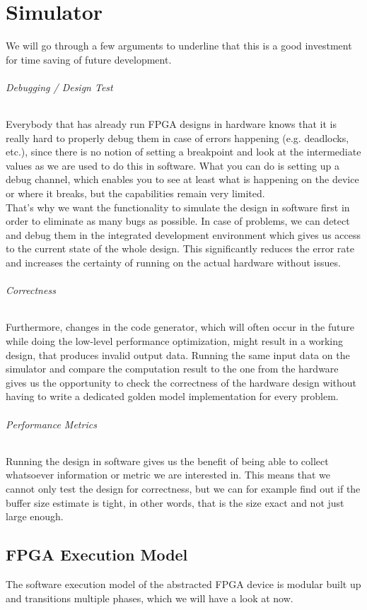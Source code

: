 \chapter{Simulator}

We will go through a few arguments to underline that this is a good investment for time saving of future development.


\subparagraph{Debugging / Design Test}
Everybody that has already run FPGA designs in hardware knows that it is really hard to properly debug them in case of errors happening (e.g. deadlocks, etc.), since there is no notion of setting a breakpoint and look at the intermediate values as we are used to do this in software. What you can do is setting up a debug channel, which enables you to see at least what is happening on the device or where it breaks, but the capabilities remain very limited. \\
That's why we want the functionality to simulate the design in software first in order to eliminate as many bugs as possible. In case of problems, we can detect and debug them in the integrated development environment which gives us access to the current state of the whole design. This significantly reduces the error rate and increases the certainty of running on the actual hardware without issues.


\subparagraph{Correctness}
Furthermore, changes in the code generator, which will often occur in the future while doing the low-level performance optimization, might result in a working design, that produces invalid output data. Running the same input data on the simulator and compare the computation result to the one from the hardware gives us the opportunity to check the correctness of the hardware design without having to write a  dedicated golden model implementation for every problem.


\subparagraph{Performance Metrics}
Running the design in software gives us the benefit of being able to collect whatsoever information or metric we are interested in. This means that we cannot only test the design for correctness, but we can for example find out if the buffer size estimate is tight, in other words, that is the size exact and not just large enough.


\section{FPGA Execution Model}
The software execution model of the abstracted FPGA device is modular built up and transitions multiple phases, which we will have a look at now.


